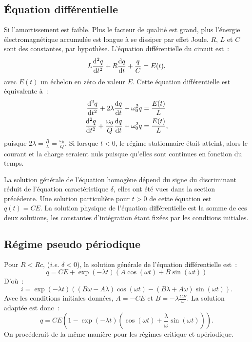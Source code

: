 \subsection{Équation différentielle}%
Si l'amortissement est faible. Plus le facteur de qualité est grand, plus 
l'énergie électromagnétique accumulée est longue à se dissiper par effet Joule. 
\(R\), \(L\) et \(C\) sont des constantes, par hypothèse. L'équation 
différentielle du circuit est~:
\begin{equation}%
  L\deriveds{q}{t} +R\derived{q}{t} +\frac{q}{C} = E(t),
\end{equation}%
avec \(E(t)\) un échelon en zéro de valeur \(E\). Cette équation différentielle 
est équivalente à~:
\begin{align}%
  \deriveds{q}{t} + 2\lambda\derived{q}{t} + \omega_0^2 q           &= 
  \frac{E(t)}{L} \\
  \deriveds{q}{t} + \frac{\omega_0}{Q}\derived{q}{t} + \omega_0^2 q &= 
  \frac{E(t)}{L},
\end{align}%
puisque \(2\lambda = \frac{R}{L} = \frac{\omega_0}{Q}\). Si lorsque \(t<0\), le 
régime stationnaire était atteint, alors le courant et la charge seraient nuls 
puisque qu'elles sont continues en fonction du temps.

La solution générale de l'équation homogène dépend du signe du discriminant 
réduit de l'équation caractéristique \(\delta\), elles ont été vues dans la 
section précédente. Une solution particulière pour \(t>0\) de cette équation 
est \(q(t)=CE\). La solution physique de l'équation différentielle est la somme 
de ces deux solutions, les constantes d'intégration étant fixées par les 
condtions initiales.
\subsection{Régime pseudo périodique}%
Pour \(R<Rc\), (\emph{i.e.} \(\delta<0\)), la solution générale de l'équation 
différentielle est~:
\begin{equation}%
  q = CE + \exp(-\lambda t)(A\cos(\omega t) + B\sin(\omega t))
\end{equation}%
D'où~:
\begin{equation}%
  i = \exp(-\lambda t)((B\omega-A\lambda)\cos(\omega t) - (B \lambda+A 
  \omega)\sin(\omega t)).
\end{equation}%
Avec les conditions initiales données, \(A=-CE\) et \(B=-\lambda 
\frac{CE}{\omega}\). La solution adaptée est donc~:
\begin{equation}%
  q = CE\left(1 - \exp(-\lambda t) \left(\cos(\omega t) + 
  \frac{\lambda}{\omega} \sin(\omega t) \right)\right).
\end{equation}%
On procéderait de la même manière pour les régimes critique et apériodique.
